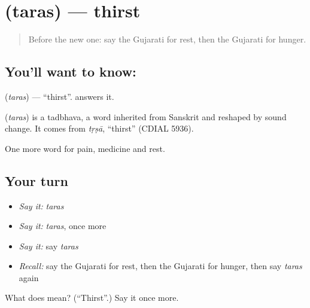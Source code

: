 \section[\texorpdfstring{\gu{તરસ} (taras)}{તરસ (taras)}]{ (taras) — thirst}

\label{lesson:GU-C49-thirst}



\begin{quote}
Before the new one: say the Gujarati for rest, then the Gujarati for hunger.
\end{quote}

\subsection*{You'll want to know: }
\textbf{} (\emph{taras}) — \textquotedblleft{}thirst\textquotedblright{}. \textbf{} answers it.

\begin{cousinweb}
\textbf{} (\emph{taras}) is a tadbhava, a word inherited from Sanskrit and reshaped by sound change. It comes from \emph{tṛṣā}, \textquotedblleft{}thirst\textquotedblright{} (CDIAL 5936).
\end{cousinweb}

\begin{grammarlens}[title={What you've built}]
One more word for pain, medicine and rest.
\end{grammarlens}

\subsection*{Your turn}
\begin{itemize}
\raggedright
  \item \emph{Say it:} \emph{taras}
  \item \emph{Say it:} \emph{taras}, once more
  \item \emph{Say it:} say \emph{taras}
  \item \emph{Recall:} say the Gujarati for rest, then the Gujarati for hunger, then say \emph{taras} again
\end{itemize}

\begin{tcolorbox}[breakable,colback=teal!4,colframe=teal!35!black,title={Before you move on}]
What does  mean? (\textquotedblleft{}Thirst\textquotedblright{}.) Say it once more.
\end{tcolorbox}
